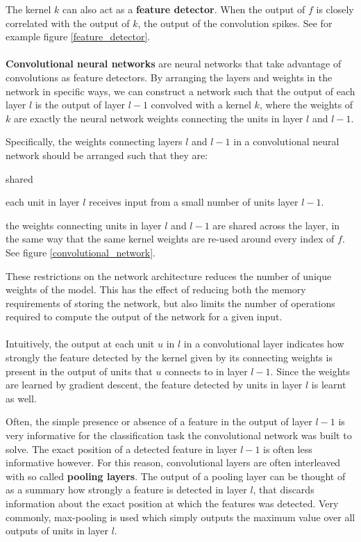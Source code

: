 The kernel $k$ can also act as a \textbf{feature detector}. When the output of $f$ is closely correlated with the output of $k$, the output of the convolution spikes. See for example figure \ref{feature_detector}.
\\\\
\textbf{Convolutional neural networks} are neural networks that take advantage of convolutions as feature detectors. By arranging the layers and weights in the network in specific ways, we can construct a network such that the output of each layer $l$ is the output of layer $l - 1$ convolved with a kernel $k$, where the weights of $k$ are exactly the neural network weights connecting the units in layer $l$ and $l - 1$.

Specifically, the weights connecting layers $l$ and $l - 1$ in a convolutional neural network should be arranged such that they are:

\begin{labeling}{shared}
	\item [\textbf{sparse}] each unit in layer $l$ receives input from a small number of units layer $l - 1$.
	\item [\textbf{shared}] the weights connecting units in layer $l$ and $l - 1$ are shared across the layer, in the same way that the same kernel weights are re-used around every index of $f$. See figure \ref{convolutional_network}.
\end{labeling}

These restrictions on the network architecture reduces the number of unique weights of the model. This has the effect of reducing both the memory requirements of storing the network, but also limits the number of operations required to compute the output of the network for a given input.
\\\\
Intuitively, the output at each unit $u$ in $l$ in a convolutional layer indicates how strongly the feature detected by the kernel given by its connecting weights is present in the output of units that $u$ connects to in layer $l - 1$. Since the weights are learned by gradient descent, the feature detected by units in layer $l$ is learnt as well.

Often, the simple presence or absence of a feature in the output of layer $l - 1$ is very informative for the classification task the convolutional network was built to solve. The exact position of a detected feature in layer $l - 1$ is often less informative however. For this reason, convolutional layers are often interleaved with so called \textbf{pooling layers}. The output of a pooling layer can be thought of as a summary how strongly a feature is detected in layer $l$, that discards information about the exact position at which the features was detected. Very commonly, max-pooling is used which simply outputs the maximum value over all outputs of units in layer $l$.

